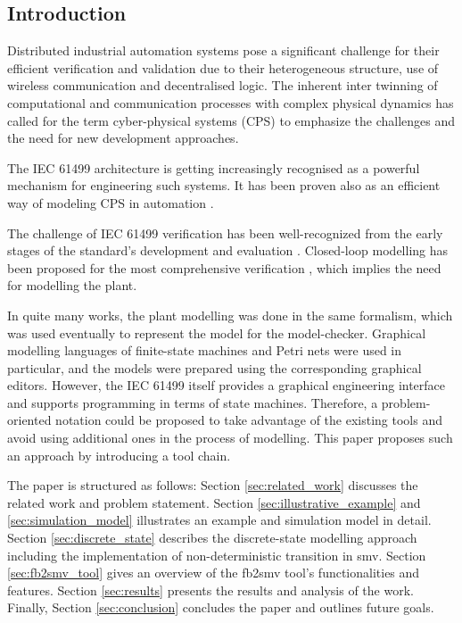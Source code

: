 \begin{bibunit}
\thispagestyle{plain}

\section{Introduction}

Distributed industrial automation systems pose a significant challenge for their efficient verification and validation due to their heterogeneous structure, use of wireless communication and decentralised logic. The inherent inter twinning of computational and communication processes with complex physical dynamics has called for the term cyber-physical systems (CPS) \cite{lee2017introduction} to emphasize the challenges and the need for new development approaches.   

The {IEC 61499} architecture \cite{iec61499part12012} is getting increasingly recognised as a powerful mechanism for engineering such systems. 
It has been proven also as an efficient way of modeling CPS in automation \cite{dai2017discrete}. 

The challenge of IEC 61499 verification has been well-recognized from the early stages of the standard's development and evaluation \cite{vyatkin1999modeling}. Closed-loop modelling has been proposed for the most comprehensive verification \cite{vyatkin2008closed}, which implies the need for modelling the plant. 

In quite many works, the plant modelling \cite{buzhinsky2016plant} was done in the same formalism, which was used eventually to represent the model for the model-checker. Graphical modelling languages of finite-state machines and Petri nets \cite{berthomieu1991modeling} were used in particular, and the models were prepared using the corresponding graphical editors.
However, the IEC 61499 itself provides a graphical engineering interface and supports programming in terms of state machines. Therefore, a problem-oriented notation could be proposed to take advantage of the existing tools and avoid using additional ones in the process of modelling. This paper proposes such an approach by introducing a tool chain.

The paper is structured as follows: Section \ref{sec:related_work} discusses the related work and problem statement. Section \ref{sec:illustrative_example} and \ref{sec:simulation_model} illustrates an example and simulation model in detail. Section \ref{sec:discrete_state} describes the discrete-state modelling approach including the implementation of non-deterministic transition in smv. Section \ref{sec:fb2smv_tool} gives an overview of the fb2smv tool's functionalities and features. Section \ref{sec:results} presents the results and analysis of the work. Finally, Section \ref{sec:conclusion} concludes the paper and outlines future goals.


\end{bibunit}
